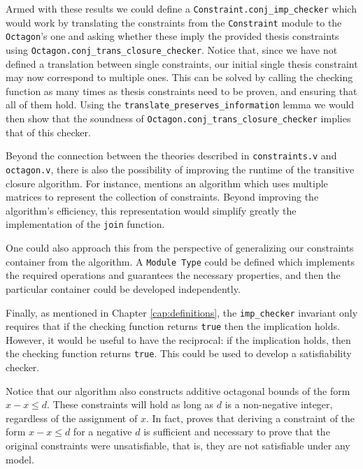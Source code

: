 Armed with these results we could define a \texttt{Constraint.conj_imp_checker}
which would work by translating the constraints from the \texttt{Constraint} module to
the \texttt{Octagon}'s one and asking whether these imply the provided thesis constraints
using \texttt{Octagon.conj_trans_closure_checker}. Notice that, since we have not defined
a translation between single constraints, our initial single thesis constraint may now correspond
to multiple ones. This can be solved by calling the checking function as many times as thesis 
constraints need to be proven, and ensuring that all of them hold. Using the 
\texttt{translate_preserves_information} lemma we would then show that the soundness of 
\texttt{Octagon.conj_trans_closure_checker} implies that of this checker.

Beyond the connection between the theories described in \texttt{constraints.v} and 
\texttt{octagon.v}, there  is also the possibility of improving the runtime of the
transitive closure algorithm. For instance, \cite{TransitiveClosure} mentions an algorithm which
uses multiple matrices to represent the collection of constraints. Beyond improving the algorithm's
efficiency, this representation would simplify greatly the implementation of the 
\texttt{join} function.

One could also approach this from the perspective of generalizing our constraints container from
the algorithm. A \texttt{Module Type} could be defined which implements the required 
operations and guarantees the necessary properties, and then the particular container could be
developed independently.

Finally, as mentioned in Chapter \ref{cap:definitions}, the \texttt{imp_checker} invariant
only requires that if the checking function returns \texttt{true} then the implication
holds. However, it would be useful to have the reciprocal: if the implication holds, then the checking
function returns \texttt{true}. This could be used to develop a satisfiability checker.

Notice that our algorithm also constructs additive octagonal bounds of the form $x - x \le d$.
These constraints will hold as long as $d$ is a non-negative integer, regardless of the assignment
of $x$. In fact, \cite{HarveyStuckey} proves that deriving a constraint of the form $x - x \le d$
for a negative $d$ is sufficient and necessary to prove that the original constraints were 
unsatisfiable, that is, they are not satisfiable under any model.

